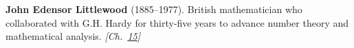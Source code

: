 \textbf{John Edensor Littlewood} (1885–1977). British mathematician who collaborated with G.H. Hardy for thirty-five years to advance number theory and mathematical analysis. \emph{[Ch.~\hyperref[ch:envelopeparadox]{15}]}

